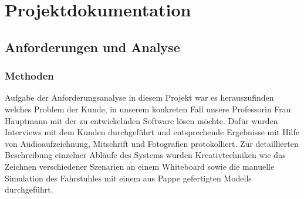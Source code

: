 \part{Projektdokumentation}
\chapter{Anforderungen und Analyse}
\section{Methoden}
Aufgabe der Anforderungsanalyse in diesem Projekt war es herauszufinden
welches Problem der Kunde, in unserem konkreten Fall unsere Professorin Frau 
Hauptmann mit der zu entwickelnden Software lösen möchte. Dafür wurden 
Interviews mit dem Kunden durchgeführt und entsprechende Ergebnisse mit Hilfe 
von Audioaufzeichnung, Mitschrift und Fotografien protokolliert. Zur 
detaillierten Beschreibung einzelner Abläufe des Systems wurden 
Kreativtechniken wie das Zeichnen verschiedener Szenarien an einem Whiteboard 
sowie die manuelle Simulation des Fahrstuhles mit einem aus Pappe gefertigten Modells durchgeführt.
